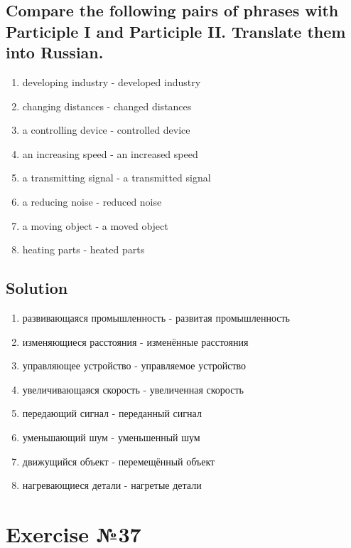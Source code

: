 \subsection*{Compare the following pairs of phrases with Participle I and Participle II.
      Translate them into Russian.}
\begin{enumerate}
      \item developing industry - developed industry
      \item changing distances - changed distances
      \item a controlling device - controlled device
      \item an increasing speed - an increased speed
      \item a transmitting signal - a transmitted signal
      \item a reducing noise - reduced noise
      \item a moving object - a moved object
      \item heating parts - heated parts
\end{enumerate}

\subsection*{Solution}
\begin{enumerate}
      \item развивающаяся промышленность - развитая промышленность
      \item изменяющиеся расстояния - изменённые расстояния
      \item управляющее устройство - управляемое устройство
      \item увеличивающаяся скорость - увеличенная скорость
      \item передающий сигнал - переданный сигнал
      \item уменьшающий шум - уменьшенный шум
      \item движущийся объект - перемещённый объект
      \item нагревающиеся детали -  нагретые детали
\end{enumerate}

\section{Exercise №37}
